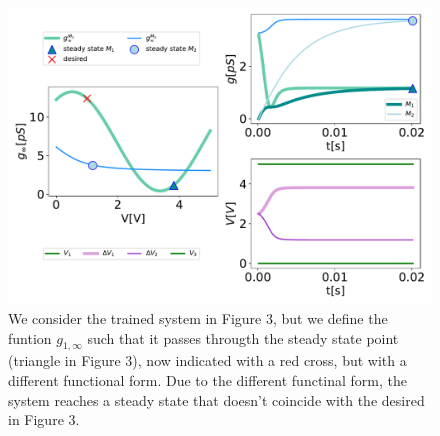 \documentclass[reprint,superscriptaddress,prb,showkeys]{revtex4-2}
\begin{document}
\begin{figure}[h]
    \centering
    \includegraphics[width=0.8\columnwidth]{plots/appendixA/grid_trained_change_func.pdf}
    \caption{We consider the trained system in Figure 3, but we define the funtion $g_{1, \infty}$ such that it passes througth the steady state point (triangle in Figure 3), now indicated with a red cross, but with a different functional form. Due to the different functinal form, the system reaches a steady state that doesn't coincide with the desired in Figure 3.}
    \label{fig:memristor_network}
\end{figure} 



\clearpage
 

\end{document}
